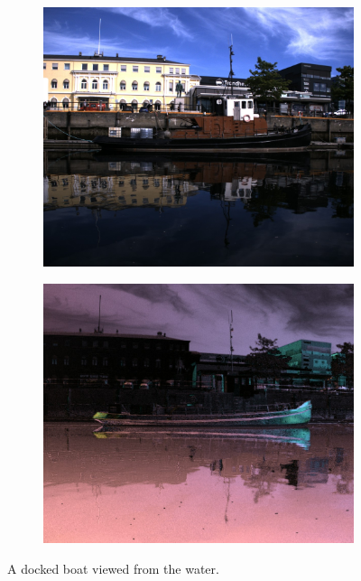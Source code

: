 \begin{figure}[H]
    \begin{subfigure}[T]{.49\textwidth}
        \includegraphics[width=\textwidth]{figures/pictures/img_4038_s0.jpg}
    \end{subfigure} \hfill
    \begin{subfigure}[T]{.49\textwidth}
        \includegraphics[width=\textwidth]{figures/pictures/img_4038_pol.jpg}
    \end{subfigure}
    \caption{A docked boat viewed from the water.}
\end{figure}
\vspace{-.5cm}

